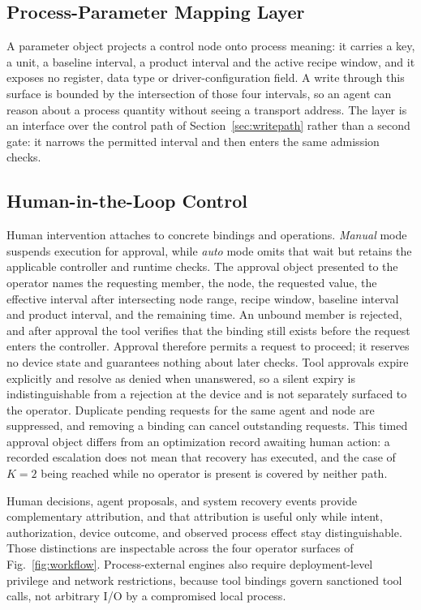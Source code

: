 \subsection{Process-Parameter Mapping Layer}
\label{sec:paramlayer}
A parameter object projects a control node onto process meaning: it carries a key, a
unit, a baseline interval, a product interval and the active recipe window, and it
exposes no register, data type or driver-configuration field. A write through this
surface is bounded by the intersection of those four intervals, so an agent can
reason about a process quantity without seeing a transport address. The layer is an
interface over the control path of Section~\ref{sec:writepath} rather than a second
gate: it narrows the permitted interval and then enters the same admission checks.

\subsection{Human-in-the-Loop Control}
\label{sec:hitl}
Human intervention attaches to concrete bindings and operations. \emph{Manual} mode
suspends execution for approval, while \emph{auto} mode omits that wait but retains
the applicable controller and runtime checks. The approval object presented to the
operator names the requesting member, the node, the requested value, the effective
interval after intersecting node range, recipe window, baseline interval and
product interval, and the remaining time. An unbound member is rejected, and
after approval the tool verifies that the binding still exists before the request
enters the controller. Approval therefore permits a request to proceed; it reserves
no device state and guarantees nothing about later checks. Tool approvals expire
explicitly and resolve as denied when unanswered, so a silent expiry is
indistinguishable from a rejection at the device and is not separately surfaced to
the operator. Duplicate pending requests for the same agent and node are
suppressed, and removing a binding can cancel outstanding requests. This timed
approval object differs from an optimization record awaiting human action: a
recorded escalation does not mean that recovery has executed, and the case of $K=2$
being reached while no operator is present is covered by neither path.

Human decisions, agent proposals, and system recovery events provide complementary
attribution, and that attribution is useful only while intent, authorization,
device outcome, and observed process effect stay distinguishable. Those distinctions
are inspectable across the four operator surfaces of Fig.~\ref{fig:workflow}.
Process-external engines also require deployment-level privilege and network
restrictions, because tool bindings govern sanctioned tool calls, not arbitrary I/O
by a compromised local process.
